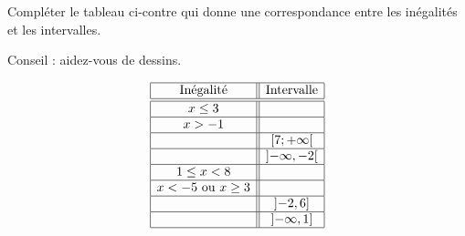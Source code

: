 
\begin{exercice}%
    \label{exosmath-0322}

    \begin{minipage}{0.485\textwidth}
    Compléter le tableau ci-contre qui donne une correspondance entre les inégalités et les intervalles.

    Conseil : aidez-vous de dessins.
    \end{minipage}
    \begin{minipage}{0.485\textwidth}
    \begin{equation*}
        \begin{array}[]{|c||c|}
            \hline
            \text{Inégalité}&\text{Intervalle}\\
            \hline\hline
            x\leq 3&\\
            \hline
            x>-1&\\
            \hline
            &\mathopen[ 7 ; +\infty [\\
            \hline
            &\mathopen] -\infty , -2 \mathclose[\\
            \hline
            1\leq x<8&\\
            \hline
            x<-5\text{ ou }x\geq 3&\\
            \hline
            &\mathopen] -2 , 6 \mathclose]\\
            \hline
            &\mathopen] -\infty , 1 \mathclose]\\
            \hline
        \end{array}
    \end{equation*}
    \end{minipage}

\end{exercice}
